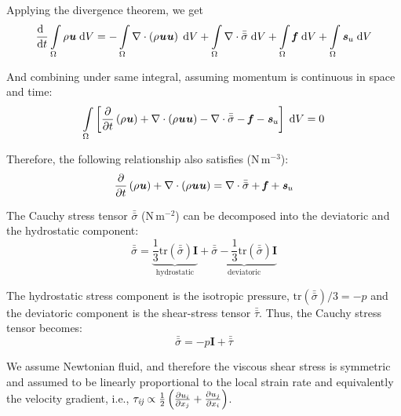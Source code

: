 Applying the divergence theorem, we get
\begin{equation}
\frac{\mathrm{d}~}{{\mathrm{d}t}} \int \limits_\Omega  {\rho }{{\textbf{\textit{u}}}}\;\mathrm{d}V =  - \int \limits_{\Omega}  \nabla \cdot \left(\rho \textbf{\textit{u}} \textbf{\textit{u}} \right)\; \mathrm{d}V +  \int \limits_\Omega \nabla \cdot \bar{\bar{{\sigma}}}\;\mathrm{d}V + \int \limits_\Omega \textbf{\textit{f}}\; \mathrm{d}V + \int \limits_\Omega \textbf{\textit{s}}_{u}\; \mathrm{d}V
\end{equation}

And combining under same integral, assuming momentum is continuous in space and time:
\begin{equation}
\int \limits_\Omega \left[ \frac{\partial}{\partial t} \left(\rho \textbf{\textit{u}} \right) + \nabla \cdot \left(\rho \textbf{\textit{u}}\textbf{\textit{u}} \right) - \nabla \cdot \bar{\bar{{\sigma}}} - \textbf{\textit{f}} -  \textbf{\textit{s}}_{u} \right]\; \mathrm{d}V = 0
\end{equation}

Therefore, the following relationship also satisfies (N\,m$^{-3}$):
\begin{equation}
\frac{\partial}{\partial t} \left(\rho \textbf{\textit{u}} \right) + \nabla \cdot \left(\rho \textbf{\textit{u}}\textbf{\textit{u}} \right) = \nabla \cdot \bar{\bar{{\sigma}}} +  \textbf{\textit{f}} +  \textbf{\textit{s}}_{u}
\end{equation}

The Cauchy stress tensor $\bar{\bar{{\sigma}}}$ (N\,m$^{-2}$) can be decomposed into the deviatoric and the hydrostatic component:
\begin{equation}
\bar{\bar{{\sigma}}} =  \underbrace{ \frac{1}{3}\mathrm{tr}\left(\bar{\bar{{\sigma}}}\right) \textbf{I} }_\text{hydrostatic}  + \underbrace{ \bar{\bar{{\sigma}}} - \frac{1}{3}\mathrm{tr}\left(\bar{\bar{{\sigma}}} \right)\textbf{I} }_\text{deviatoric}
\end{equation}

The hydrostatic stress component is the isotropic pressure, $\mathrm{tr}\left(\bar{\bar{{\sigma}}} \right)/3 = -p$ and the deviatoric component is the shear-stress tensor $\bar{\bar{{\tau}}}$. Thus, the Cauchy stress tensor becomes:
\begin{equation}
\bar{\bar{\sigma}} = -p\textbf{I} + \bar{\bar{{\tau}}}
\end{equation}

\begin{assumption}
	We assume Newtonian fluid, and therefore the viscous shear stress is symmetric and assumed to be linearly proportional to the local strain rate and equivalently the velocity gradient, i.e., $\tau_{\textit{ij}} \propto \frac{1}{2}\left(\frac{\partial u_i}{\partial x_j} + \frac{\partial u_j}{\partial x_i}\right)$.
\end{assumption}

